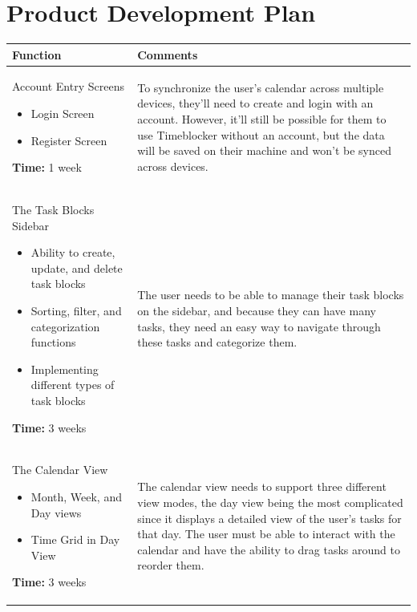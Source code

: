 \documentclass[12pt]{report}
\begin{document}
\section*{Product Development Plan}
\def\arraystretch{1.5}
\begin{tabularx}{\textwidth}{|X|X|}
	\hline
	Function
	 & Comments
	\\\hline
	Account Entry Screens
	\begin{itemize}
		\item Login Screen
		\item Register Screen
	\end{itemize}
	\textbf{Time:} 1 week
	 &
	To synchronize the user's calendar across multiple devices, they’ll need to create and login with an account.
	However, it'll still be possible for them to use Timeblocker without an account, but the data will be saved on their machine and won’t be synced across devices.
	\\\hline
	The Task Blocks Sidebar
	\begin{itemize}
		\item Ability to create, update, and delete task blocks
		\item Sorting, filter, and categorization functions
		\item Implementing different types of task blocks
	\end{itemize}
	\textbf{Time:} 3 weeks
	 &
	The user needs to be able to manage their task blocks on the sidebar, and because they can have many tasks, they need an easy way to navigate through these tasks and categorize them.
	\\\hline
	The Calendar View
	\begin{itemize}
		\item Month, Week, and Day views
		\item Time Grid in Day View
	\end{itemize}
	\textbf{Time:} 3 weeks
	 &
	The calendar view needs to support three different view modes, the day view being the most complicated since it displays a detailed view of the user’s tasks for that day.
	The user must be able to interact with the calendar and have the ability to drag tasks around to reorder them.
	\\\hline
\end{tabularx}
\end{document}
